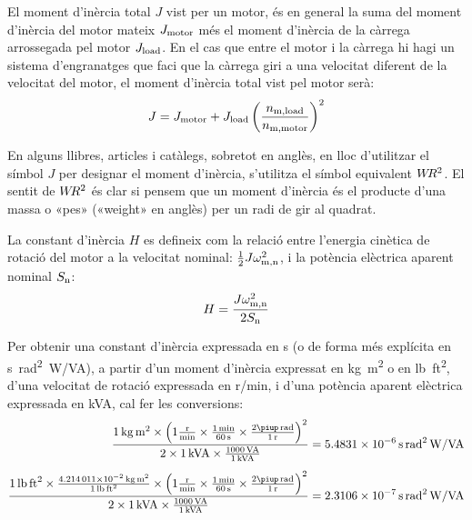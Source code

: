El moment d'inèrcia total $J$ vist per un motor, és en general la suma del moment d'inèrcia del  motor mateix $J_\mathrm{motor}$ més el moment d'inèrcia de la càrrega arrossegada pel motor $J_\mathrm{load}$. En el cas que entre el motor i la càrrega hi hagi un sistema d'engranatges que faci que la càrrega giri a una velocitat diferent de la velocitat del motor, el  moment d'inèrcia total vist pel motor serà:
\begin{equation}\index{moment d'inèria}\index{J@f$J$}
    J = J\ped{motor} +  J\ped{load}
    \left(\frac{n\ped{m,load}}{n\ped{m,motor}}\right)^2
\end{equation}

En alguns llibres, articles i catàlegs, sobretot en anglès, en lloc d'utilitzar el símbol $J$ per designar el moment d'inèrcia, s'utilitza el símbol equivalent $W\hspace{-0.2em}R^2$. El sentit de $W\hspace{-0.2em}R^2$ és clar si pensem que un moment d'inèrcia és el producte d'una massa o «pes» («weight» en anglès) per un radi de gir al quadrat.

La constant d'inèrcia $H$ es defineix com la relació entre l'energia cinètica de rotació del motor  a la velocitat nominal: $\frac{1}{2} J \omega_\mathrm{m,n}^2$, i la  potència elèctrica aparent nominal $S_\mathrm{n}$:
\begin{equation}\index{constant d'inèria}\index{J@$H$}
    H = \frac{J \omega\ped{m,n}^2}{2 S\ped{n}}
\end{equation}

Per  obtenir una constant d'inèrcia  expressada en \si{s} (o de forma més explícita en \si{s.rad^2.W/VA}), a partir d'un moment d'inèrcia expressat en \si{kg.m^2} o en \si{lb.ft^2}, d'una velocitat de rotació expressada en \si{r/min}, i d'una potència aparent elèctrica expressada en \si{kVA}, cal  fer les conversions:
\begin{subequations}
\begin{align}
    \frac{\SI{1}{kg.m^2} \times \left(1\frac{\si{r}}{\si{min}} \times \frac{\SI{1}{min}}{\SI{60}{s}} \times \frac{2\piup\,\si{rad}}{\SI{1}{r}}\right)^2}{2\times \SI{1}{kVA} \times \frac{\SI{1000}{VA}}{\SI{1}{kVA}}}  &= \SI{5,4831e-6}{s.rad^2.W/VA} \\[1ex]
   \frac{\SI{1}{lb.ft^2} \times \frac{\SI{4,214011e-2}{kg.m^2}}{\SI{1}{lb.ft^2}} \times \left(1\frac{\si{r}}{\si{min}} \times \frac{\SI{1}{min}}{\SI{60}{s}} \times \frac{2\piup\,\si{rad}}{\SI{1}{r}}\right)^2}{2\times \SI{1}{kVA}  \times
   \frac{\SI{1000}{VA}}{\SI{1}{kVA}}} &= \SI{2,3106e-7}{s.rad^2.W/VA}
\end{align}
\end{subequations}

